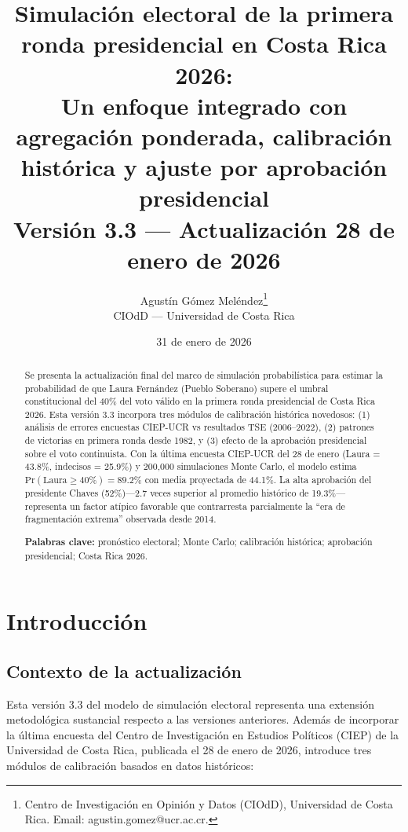 \documentclass[11pt,a4paper]{article}
\title{%
\textbf{Simulación electoral de la primera ronda presidencial en Costa Rica 2026:}\\[0.3cm]
\large Un enfoque integrado con agregación ponderada, calibración histórica y ajuste por aprobación presidencial\\[0.5cm]
\normalsize Versión 3.3 --- Actualización 28 de enero de 2026
}
\author{
Agustín Gómez Meléndez\thanks{Centro de Investigación en Opinión y Datos (CIOdD), Universidad de Costa Rica. Email: agustin.gomez@ucr.ac.cr.}\\
\small CIOdD --- Universidad de Costa Rica
}
\date{31 de enero de 2026}
\newcommand{\prob}[1]{\text{Pr}(#1)}
\begin{document}
\maketitle

\begin{abstract}
Se presenta la actualización final del marco de simulación probabilística para estimar la probabilidad de que Laura Fernández (Pueblo Soberano) supere el umbral constitucional del 40\% del voto válido en la primera ronda presidencial de Costa Rica 2026. Esta versión 3.3 incorpora tres módulos de calibración histórica novedosos: (1) análisis de errores encuestas CIEP-UCR vs resultados TSE (2006--2022), (2) patrones de victorias en primera ronda desde 1982, y (3) efecto de la aprobación presidencial sobre el voto continuista. Con la última encuesta CIEP-UCR del 28 de enero (Laura = 43.8\%, indecisos = 25.9\%) y 200,000 simulaciones Monte Carlo, el modelo estima $\prob{\text{Laura} \geq 40\%} = 89.2\%$ con media proyectada de 44.1\%. La alta aprobación del presidente Chaves (52\%)---2.7 veces superior al promedio histórico de 19.3\%---representa un factor atípico favorable que contrarresta parcialmente la ``era de fragmentación extrema'' observada desde 2014.

\medskip
\noindent\textbf{Palabras clave:} pronóstico electoral; Monte Carlo; calibración histórica; aprobación presidencial; Costa Rica 2026.
\end{abstract}

\tableofcontents
\newpage

\section{Introducción}

\subsection{Contexto de la actualización}

Esta versión 3.3 del modelo de simulación electoral representa una extensión metodológica sustancial respecto a las versiones anteriores. Además de incorporar la última encuesta del Centro de Investigación en Estudios Políticos (CIEP) de la Universidad de Costa Rica, publicada el 28 de enero de 2026, introduce tres módulos de calibración basados en datos históricos:
\end{document}
